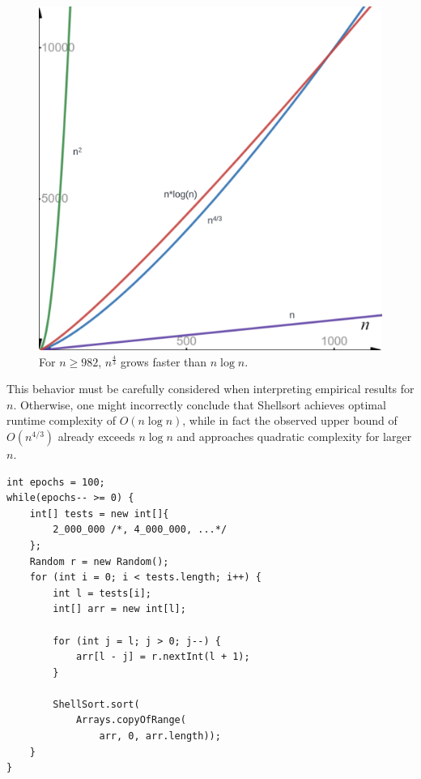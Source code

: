 \begin{figure}[!h]
    \centering
    \includegraphics[width=1\columnwidth]{img/lognplot}
    \caption{For $n \geq 982$, $n^{\frac{4}{3}}$ grows faster than $n \log n$.}
    \label{fig:lognplot}
\end{figure}

\noindent
This behavior must be carefully considered when interpreting empirical results for $n$.
Otherwise, one might incorrectly conclude that Shellsort achieves optimal runtime complexity of $O(n \log n)$, while in fact the observed upper bound of $O(n^{4/3})$ already exceeds $n \log n$ and approaches quadratic complexity for larger $n$.



\vspace{4mm}
\begin{lstlisting}[style=javastyle, caption={Code for Shellsort-testing large randomized arrays.}, label=lst:rand]
int epochs = 100;
while(epochs-- >= 0) {
    int[] tests = new int[]{
        2_000_000 /*, 4_000_000, ...*/
    };
    Random r = new Random();
    for (int i = 0; i < tests.length; i++) {
        int l = tests[i];
        int[] arr = new int[l];

        for (int j = l; j > 0; j--) {
            arr[l - j] = r.nextInt(l + 1);
        }

        ShellSort.sort(
            Arrays.copyOfRange(
                arr, 0, arr.length));
    }
}
\end{lstlisting}
\vspace{4mm}


